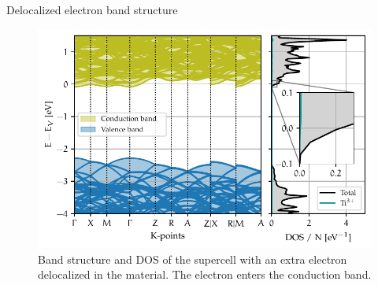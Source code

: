 \documentclass[11pt, xcolor=dvipsnames, aspectratio=43]{beamer}
\begin{document}
\begin{frame}{Delocalized electron band structure}
    \begin{figure}
        \centering
        \includegraphics[height=0.7\textheight]{figures/deloc.pdf}
        \caption{Band structure and DOS of the supercell with an extra electron delocalized in the material. The electron enters the conduction band.}
    \end{figure}
\end{frame}
\end{document}
